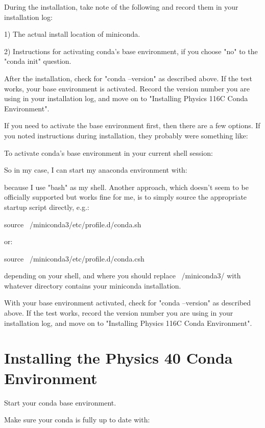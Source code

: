 During the installation, take note of the following and record them in
your installation log:

1) The actual install location of miniconda.

2) Instructions for activating conda's base environment, if you choose
"no" to the "conda init" question.

After the installation, check for "conda --version" as described
above.  If the test works, your base environment is activated.  Record
the version number you are using in your installation log, and move on
to "Installing Physics 116C Conda Environment".

If you need to activate the base environment first, then there are
a few options.  If you noted instructions during installation, they
probably were something like:

  To activate conda's base environment in your current shell session:


So in my case, I can start my anaconda environment with:


because I use "bash" as my shell.  Another approach, which doesn't
seem to be officially supported but works fine for me, is to simply
source the appropriate startup script directly, e.g.:

  source ~/miniconda3/etc/profile.d/conda.sh

or:

  source ~/miniconda3/etc/profile.d/conda.csh

depending on your shell, and where you should replace ~/miniconda3/
with whatever directory contains your miniconda installation.

With your base environment activated, check for "conda --version" as
described above.  If the test works, record the version number you are
using in your installation log, and move on to "Installing Physics
116C Conda Environment".

\section{Installing the Physics 40 Conda Environment}

Start your conda base environment.

Make sure your conda is fully up to date with:

